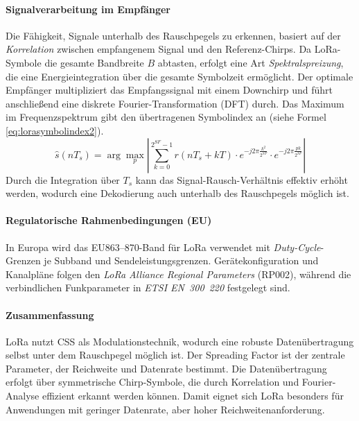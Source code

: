 \paragraph*{Signalverarbeitung im Empfänger}  
Die Fähigkeit, Signale unterhalb des Rauschpegels zu erkennen, basiert auf der \textit{Korrelation} zwischen empfangenem Signal und den  Referenz-Chirps. 
Da LoRa-Symbole die gesamte Bandbreite $B$ abtasten, erfolgt eine Art \textit{Spektralspreizung}, die eine Energieintegration über die gesamte Symbolzeit ermöglicht. 
Der optimale Empfänger multipliziert das Empfangssignal mit einem Downchirp und führt anschließend eine diskrete Fourier-Transformation (DFT) durch. 
Das Maximum im Frequenzspektrum gibt den übertragenen Symbolindex an (siehe Formel \ref{eq:lorasymbolindex2}).
\begin{equation}
\label{eq:lorasymbolindex2}
\hat{s}(nT_s) = \arg \max_p \left| \sum_{k=0}^{2^{SF}-1} r(nT_s+kT) \cdot e^{-j 2\pi \frac{k^2}{2^{SF}}} \cdot e^{-j 2\pi \frac{p k}{2^{SF}}} \right|
\end{equation}
Durch die Integration über $T_s$ kann das Signal-Rausch-Verhältnis effektiv erhöht werden, wodurch eine Dekodierung auch unterhalb des Rauschpegels möglich ist. \autocite{tulkaLoRaSpreadingFactor, 8067462}  

\paragraph*{Regulatorische Rahmenbedingungen (EU)}
In Europa wird das EU863–870-Band für LoRa verwendet mit \emph{Duty-Cycle}-Grenzen je Subband und Sendeleistungsgrenzen. Gerätekonfiguration und Kanalpläne folgen den \emph{LoRa Alliance Regional Parameters} (RP002), während die verbindlichen Funkparameter in \emph{ETSI EN~300~220} festgelegt sind. 
\autocite{RP002104, ETSIEN3002202025}

\paragraph*{Zusammenfassung}  
LoRa nutzt CSS als Modulationstechnik, wodurch eine robuste Datenübertragung selbst unter dem Rauschpegel möglich ist. 
Der Spreading Factor ist der zentrale Parameter, der Reichweite und Datenrate bestimmt. 
Die Datenübertragung erfolgt über symmetrische Chirp-Symbole, die durch Korrelation und Fourier-Analyse effizient erkannt werden können. 
Damit eignet sich LoRa besonders für Anwendungen mit geringer Datenrate, aber hoher Reichweitenanforderung. 


